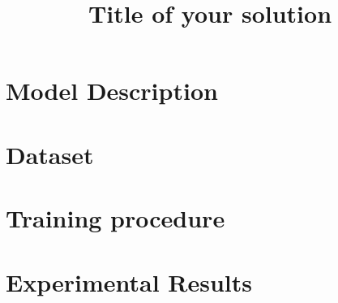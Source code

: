 \documentclass{midl} %
\title[Title of your solution]{Title of your solution}
\begin{document}
\maketitle

\section{Model Description}


\section{Dataset}


\section{Training procedure}


\section{Experimental Results}

\end{document}

